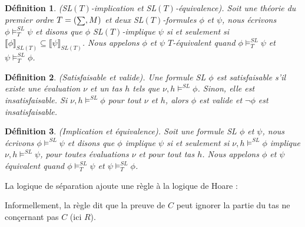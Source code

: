 \documentclass[11pt,openany]{article}
\newcommand\phibra{\llbracket\phi\rrbracket}
\newcommand\psibra{\llbracket\psi\rrbracket}
\newcommand\smallsum{\mathsmaller\sum}
\newtheorem{definition}{D\'efinition}[subsection]
\begin{document}
\begin{definition}
(SL$(T)$-implication et SL$(T)$-\'equivalence). Soit une th\'eorie du premier ordre $T=(\smallsum,M)$ et deux SL$(T)$-formules $\phi$ et $\psi$, nous \'ecrivons $\phi\models^{SL}_{T}\psi$ et disons que $\phi$ SL$(T)$-implique $\psi$ si et seulement si $\phibra_{SL(T)}\subseteq\psibra_{SL(T)}$. Nous appelons $\phi$ et $\psi$ $T$-\'equivalent quand  $\phi\models^{SL}_{T}\psi$ et $\psi\models^{SL}_{T}\phi$. 
\end{definition}

\begin{definition}
(Satisfaisable et valide). Une formule SL $\phi$ est satisfaisable s'il existe une \'evaluation $\nu$ et un tas $h$ tels que $\nu,h\models^{SL}\phi$. Sinon, elle est \textit{insatisfaisable}. Si $\nu,h\models^{SL}\phi$ pour tout $\nu$ et $h$, alors $\phi$ est valide et $\neg\phi$ est insatisfaisable.
\end{definition}

\begin{definition}
(Implication et \'equivalence). Soit une formule SL $\phi$ et $\psi$, nous \'ecrivons $\phi\models^{SL}\psi$ et disons que $\phi$ implique $\psi$ si et seulement si $\nu,h\models^{SL}\phi$ implique $\nu,h\models^{SL}\psi$, pour toutes \'evaluations $\nu$ et pour tout tas $h$. Nous appelons $\phi$ et $\psi$ \'equivalent quand $\phi\models^{SL}_{T}\psi$ et $\psi\models^{SL}_{T}\phi$. 
\end{definition}

La logique de s\'eparation ajoute une r\`egle \`a la logique de Hoare :
		\begin{center}
		


		\end{center}
		Informellement, la r\`egle dit que la preuve de $C$ peut ignorer la partie du tas ne con\c{c}ernant pas $C$ (ici $R$).
		
\end{document}
